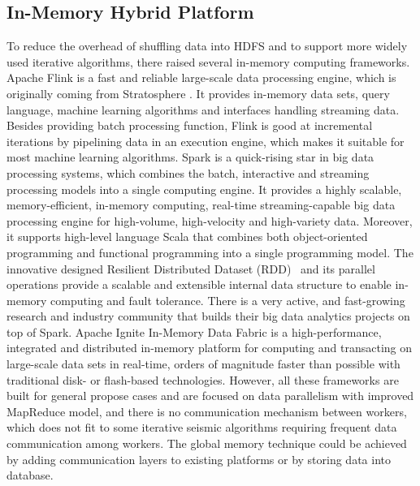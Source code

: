 \subsection{In-Memory Hybrid Platform}
To reduce the overhead of shuffling data into HDFS and to support more widely used iterative algorithms, there raised several in-memory computing frameworks. Apache Flink \cite{ApacheFlink} is a fast and reliable large-scale data processing engine, which is originally coming from Stratosphere \cite{Alexandrov2013Stratosphere}. It provides in-memory data sets, query language, machine learning algorithms and interfaces handling streaming data. Besides providing batch processing function, Flink is good at incremental iterations by pipelining data in an execution engine, which makes it suitable for most machine learning algorithms. 
Spark \cite{ZahariaSCC1863113} is a quick-rising star in big data processing systems, which combines the batch, interactive and streaming~\cite{ZahariaDSE2342773} processing models into a single computing engine. It provides a highly scalable, memory-efficient, in-memory computing, real-time streaming-capable big data processing engine for high-volume, high-velocity and high-variety data. Moreover, it supports high-level language Scala that combines both object-oriented programming and functional programming into a single programming model. The innovative designed Resilient Distributed Dataset (RDD)~\cite{SparkRDD} and its parallel operations provide a scalable and extensible internal data structure to enable in-memory computing and fault tolerance. There is a very active, and fast-growing research and industry community that builds their big data analytics projects on top of Spark. 
Apache Ignite \cite{ApacheIgnite} In-Memory Data Fabric is a high-performance, integrated and distributed in-memory platform for computing and transacting on large-scale data sets in real-time, orders of magnitude faster than possible with traditional disk- or flash-based technologies. 
However, all these frameworks are built for general propose cases and are focused on data parallelism with improved MapReduce model, and there is no communication mechanism between workers, which does not fit to some iterative seismic algorithms requiring frequent data communication among workers. The global memory technique could be achieved by adding communication layers to existing platforms or by storing data into database. 

